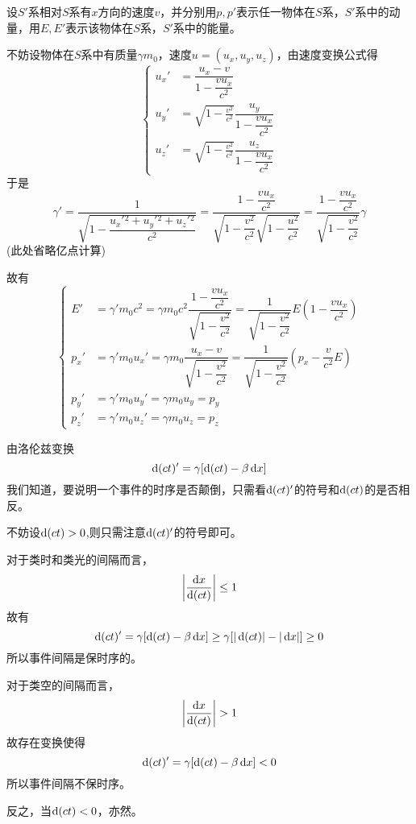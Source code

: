 \begin{prove}
    设$S'$系相对$S$系有$x$方向的速度$v$，并分别用$p,p'$表示任一物体在$S$系，$S'$系中的动量，用$E,E'$表示该物体在$S$系，$S'$系中的能量。

    不妨设物体在$S$系中有质量$\gamma m_0$，速度$u=(u_x,u_y,u_z)$，由速度变换公式得
    \[
        \left\{\begin{aligned}
            u_x' & =\dfrac{u_x-v}{1-\dfrac{vu_x}{c^2}}                       \\[1ex]
            u_y' & =\sqrt{1-\frac{v^2}{c^2}}\dfrac{u_y}{1-\dfrac{vu_x}{c^2}} \\[1ex]
            u_z' & =\sqrt{1-\frac{v^2}{c^2}}\dfrac{u_z}{1-\dfrac{vu_x}{c^2}}
        \end{aligned}\right.
    \]
    于是\[\gamma'=\dfrac{1}{\sqrt{1-\dfrac{u_x'{}^2+u_y'{}^2+u_z'{}^2}{c^2}}}=\dfrac{1-\dfrac{vu_x}{c^2}}{\sqrt{1-\dfrac{v^2}{c^2}}\sqrt{1-\dfrac{u^2}{c^2}}}=\dfrac{1-\dfrac{vu_x}{c^2}}{\sqrt{1-\dfrac{v^2}{c^2}}}\gamma\]
    (此处省略亿点计算)

    故有
    \[
        \left\{\begin{aligned}
            E'   & =\gamma'm_0c^2=\gamma m_0c^2\dfrac{1-\dfrac{vu_x}{c^2}}{\sqrt{1-\dfrac{v^2}{c^2}}}=\dfrac{1}{\sqrt{1-\dfrac{v^2}{c^2}}}E(1-\dfrac{vu_x}{c^2}) \\
            p_x' & =\gamma'm_0u_x'=\gamma m_0\dfrac{u_x-v}{\sqrt{1-\dfrac{v^2}{c^2}}}=\dfrac{1}{\sqrt{1-\dfrac{v^2}{c^2}}}(p_x-\dfrac{v}{c^2}E)                  \\
            p_y' & =\gamma'm_0u_y'=\gamma m_0u_y=p_y                                                                                                             \\
            p_z' & =\gamma'm_0u_z'=\gamma m_0u_z=p_z
        \end{aligned}\right.
    \]
\end{prove}
\begin{prove}
    由洛伦兹变换
    \[\dif (ct)'=\gamma[\dif (ct)-\beta \dif x]\]
    我们知道，要说明一个事件的时序是否颠倒，只需看$\dif (ct)'$的符号和$\dif (ct)$的是否相反。

    不妨设$\dif (ct)>0$,则只需注意$\dif (ct)'$的符号即可。

    对于类时和类光的间隔而言，
    \[\left|\frac{\dif x}{\dif (ct)}\right|\le 1\]
    故有
    \[\dif (ct)'=\gamma[\dif (ct)-\beta \dif x] \ge \gamma[|\dif(ct)|-|\dif x|] \ge 0\]
    所以事件间隔是保时序的。

    对于类空的间隔而言，
    \[\left|\frac{\dif x}{\dif (ct)}\right|> 1\]
    故存在变换使得
    \[\dif (ct)'=\gamma[\dif (ct)-\beta \dif x] < 0\]
    所以事件间隔不保时序。

    反之，当$\dif(ct)<0$，亦然。
\end{prove}